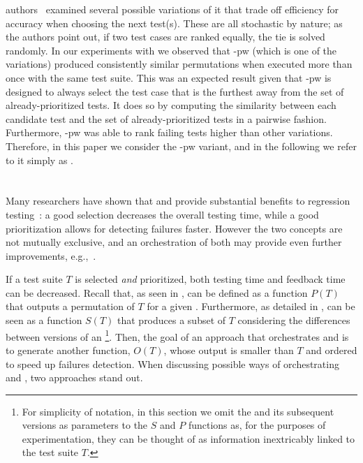 \fs authors~\cite{miranda_fast_2018} examined several possible variations of it
that trade off efficiency for accuracy when choosing the next test(s).
These are all stochastic by nature;
as the authors point out, if two test cases are ranked equally, the tie is solved randomly.
In our experiments with \fs we observed that \fs-pw (which is one of the variations) produced consistently similar permutations when executed more than once with the same test suite. 
This was an expected result given that \fs-pw is designed to always select the test case that is the furthest away from the set of already-prioritized tests.
It does so by computing the similarity between each candidate test and the set of already-prioritized tests in a pairwise fashion.
Furthermore, \fs-pw was able to rank failing tests  higher than other variations. 
Therefore, in this paper  we consider the \fs-pw variant, and in the following we refer to it simply as \fs.


\section{\fz}\label{sec:orch_fastazi}

Many researchers have shown that \tcs and \tcp  provide substantial benefits 
to regression testing~\cite{bin_ali_search_2019, kazmi_effective_2017, khatibsyarbini_test_2018, RothermelHarrold94FrameworkForEvaluationRTS}:
a good selection decreases the overall testing time, while a good prioritization allows for detecting failures faster.
However the two concepts are not mutually exclusive, and an orchestration of both may provide even further improvements, e.g.,~\cite{spieker_reinforcement_2017,elbaum2014techniques}.

If a test suite $T$ is selected \textit{and} prioritized, both testing time and feedback time can be decreased.
Recall that, as seen in , \tcp can be defined as a function $P(T)$ that outputs a permutation of $T$ for a given \sut.
Furthermore, as detailed in , \tcs can be seen as a function $S(T)$ that produces a subset of $T$ considering the differences between versions of an \sut \footnote{For simplicity of notation, in this section we omit the \sut and its subsequent versions as parameters to the $S$ and $P$ functions as, for the purposes of experimentation, they can be thought of as information inextricably linked to the test suite $T$.}.
Then, the goal of an approach that orchestrates \tcs and \tcp is to generate another function, $O(T)$, 
whose output is smaller than $T$ and ordered to speed up failures detection.
When discussing possible ways of orchestrating \tcs and \tcp, two approaches stand out.

